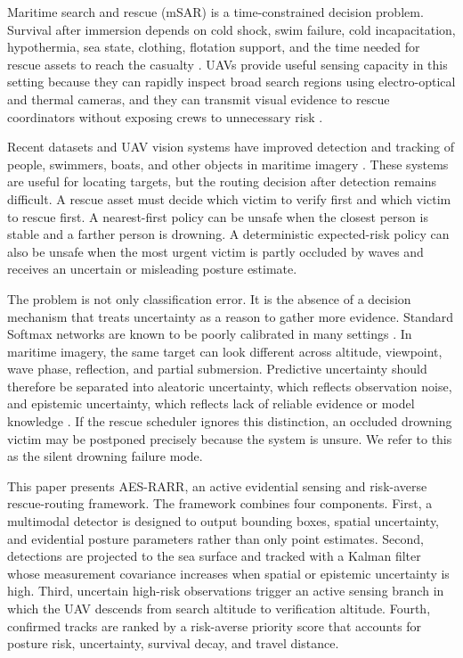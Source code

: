 \documentclass[runningheads]{llncs}
\newcommand{\aes}{AES-RARR}
\begin{document}
Maritime search and rescue (mSAR) is a time-constrained decision problem. Survival after immersion depends on cold shock, swim failure, cold incapacitation, hypothermia, sea state, clothing, flotation support, and the time needed for rescue assets to reach the casualty \cite{golden2002,tipton2011,bierens2016,iamsar2019}. UAVs provide useful sensing capacity in this setting because they can rapidly inspect broad search regions using electro-optical and thermal cameras, and they can transmit visual evidence to rescue coordinators without exposing crews to unnecessary risk \cite{queralta2020,messmer2024holistic}.

Recent datasets and UAV vision systems have improved detection and tracking of people, swimmers, boats, and other objects in maritime imagery \cite{varga2022seadronessee,ngo2026drowning}. These systems are useful for locating targets, but the routing decision after detection remains difficult. A rescue asset must decide which victim to verify first and which victim to rescue first. A nearest-first policy can be unsafe when the closest person is stable and a farther person is drowning. A deterministic expected-risk policy can also be unsafe when the most urgent victim is partly occluded by waves and receives an uncertain or misleading posture estimate.

The problem is not only classification error. It is the absence of a decision mechanism that treats uncertainty as a reason to gather more evidence. Standard Softmax networks are known to be poorly calibrated in many settings \cite{guo2017calibration}. In maritime imagery, the same target can look different across altitude, viewpoint, wave phase, reflection, and partial submersion. Predictive uncertainty should therefore be separated into aleatoric uncertainty, which reflects observation noise, and epistemic uncertainty, which reflects lack of reliable evidence or model knowledge \cite{kendall2017uncertainties}. If the rescue scheduler ignores this distinction, an occluded drowning victim may be postponed precisely because the system is unsure. We refer to this as the silent drowning failure mode.

This paper presents \aes, an active evidential sensing and risk-averse rescue-routing framework. The framework combines four components. First, a multimodal detector is designed to output bounding boxes, spatial uncertainty, and evidential posture parameters rather than only point estimates. Second, detections are projected to the sea surface and tracked with a Kalman filter whose measurement covariance increases when spatial or epistemic uncertainty is high. Third, uncertain high-risk observations trigger an active sensing branch in which the UAV descends from search altitude to verification altitude. Fourth, confirmed tracks are ranked by a risk-averse priority score that accounts for posture risk, uncertainty, survival decay, and travel distance.
\end{document}
